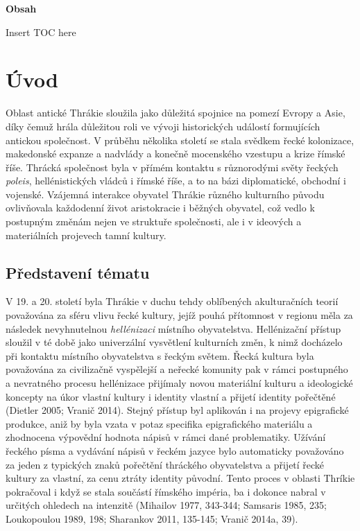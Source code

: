 {\bf Obsah}

Insert TOC here

\chapter{Úvod}

Oblast antické Thrákie sloužila jako důležitá spojnice na pomezí Evropy a Asie, díky čemuž hrála důležitou roli ve vývoji historických událostí formujících antickou společnost. V průběhu několika století se stala svědkem řecké kolonizace, makedonské expanze a nadvlády a konečně mocenského vzestupu a krize římské říše. Thrácká společnost byla v přímém kontaktu s různorodými světy řeckých {\em poleis}, hellénistických vládců i římské říše, a to na bázi diplomatické, obchodní i vojenské. Vzájemná interakce obyvatel Thrákie různého kulturního původu ovlivňovala každodenní život aristokracie i běžných obyvatel, což vedlo k postupným změnám nejen ve struktuře společnosti, ale i v ideových a materiálních projevech tamní kultury.

\section[představení-tématu]{Představení tématu}

V 19. a 20. století byla Thrákie v duchu tehdy oblíbených akulturačních teorií považována za sféru vlivu řecké kultury, jejíž pouhá přítomnost v regionu měla za následek nevyhnutelnou {\em hellénizaci} místního obyvatelstva. Hellénizační přístup sloužil v té době jako univerzální vysvětlení kulturních změn, k nimž docházelo při kontaktu místního obyvatelstva s řeckým světem. Řecká kultura byla považována za civilizačně vyspělejší a neřecké komunity pak v rámci postupného a nevratného procesu hellénizace přijímaly novou materiální kulturu a ideologické koncepty na úkor vlastní kultury i identity vlastní a přijetí identity pořečtěné (Dietler 2005; Vranič 2014). Stejný přístup byl aplikován i na projevy epigrafické produkce, aniž by byla vzata v potaz specifika epigrafického materiálu a zhodnocena výpovědní hodnota nápisů v rámci dané problematiky. Užívání řeckého písma a vydávání nápisů v řeckém jazyce bylo automaticky považováno za jeden z typických znaků pořečtění thráckého obyvatelstva a přijetí řecké kultury za vlastní, za cenu ztráty identity původní. Tento proces v oblasti Thríkie pokračoval i když se stala součástí římského impéria, ba i dokonce nabral v určitých ohledech na intenzitě (Mihailov 1977, 343-344; Samsaris 1985, 235; Loukopoulou 1989, 198; Sharankov 2011, 135-145; Vranič 2014a, 39).

